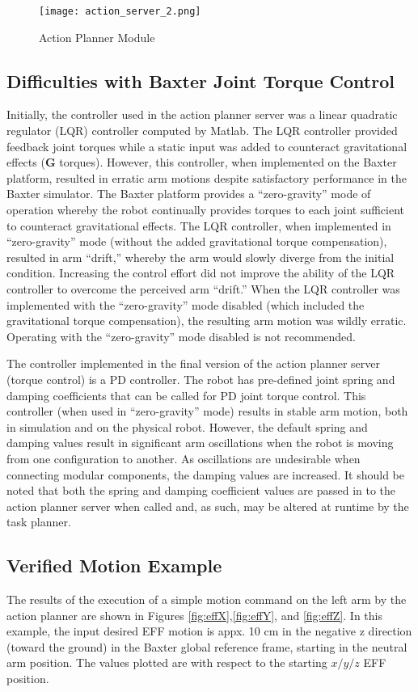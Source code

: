 \begin{figure}[h]
	\texttt{[image: action\_server\_2.png]}
	\caption{Action Planner Module}
	\label{fig:actionPlannerFlow}
\end{figure}


\subsection{Difficulties with Baxter Joint Torque Control}
Initially, the controller used in the action planner server was a linear quadratic regulator (LQR) controller computed by Matlab.
The LQR controller provided feedback joint torques while a static input was added to counteract gravitational effects ($\mathbf{G}$ torques).
However, this controller, when implemented on the Baxter platform, resulted in erratic arm motions despite satisfactory performance in the Baxter simulator.
The Baxter platform provides a ``zero-gravity'' mode of operation whereby the robot continually provides torques to each joint sufficient to counteract gravitational effects.
The LQR controller, when implemented in ``zero-gravity'' mode (without the added gravitational torque compensation), resulted in arm ``drift,'' whereby the arm would slowly diverge from the initial condition.
Increasing the control effort did not improve the ability of the LQR controller to overcome the perceived arm ``drift.''
When the LQR controller was implemented with the ``zero-gravity'' mode disabled (which included the gravitational torque compensation), the resulting arm motion was wildly erratic.
Operating with the ``zero-gravity'' mode disabled is not recommended.

The controller implemented in the final version of the action planner server (torque control) is a PD controller.
The robot has pre-defined joint spring and damping coefficients that can be called for PD joint torque control.
This controller (when used in ``zero-gravity'' mode) results in stable arm motion, both in simulation and on the physical robot.
However, the default spring and damping values result in significant arm oscillations when the robot is moving from one configuration to another.
As oscillations are undesirable when connecting modular components, the damping values are increased.
It should be noted that both the spring and damping coefficient values are passed in to the action planner server when called and, as such, may be altered at runtime by the task planner.

\subsection{Verified Motion Example}
The results of the execution of a simple motion command on the left arm by the action planner are shown in Figures \ref{fig:effX},\ref{fig:effY}, and \ref{fig:effZ}.
In this example, the input desired EFF motion is appx. 10 cm in the negative z direction (toward the ground) in the Baxter global reference frame, starting in the neutral arm position.
The values plotted are with respect to the starting $x/y/z$ EFF position.

